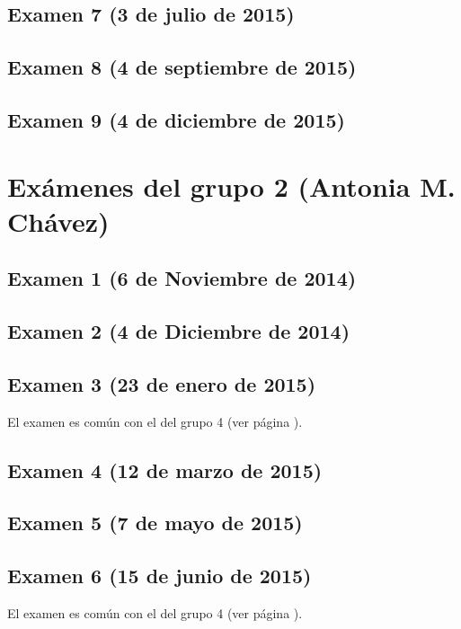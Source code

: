 \documentclass[a4paper,12pt,twoside]{book}
\begin{document}
\subsection{Examen 7 (3 de julio de 2015)}
 \label{examen_14_15_5_7}
\subsection{Examen 8 (4 de septiembre de 2015)}
 \label{examen_14_15_5_8}
\subsection{Examen 9 (4 de diciembre de 2015)}
 \label{examen_14_15_5_9}

\section{Exámenes del grupo 2 (Antonia M. Chávez)}
\subsection{Examen 1 (6 de Noviembre de 2014)}
\subsection{Examen 2 (4 de Diciembre de 2014)}
\subsection{Examen 3 (23 de enero de 2015)}
El examen es común con el del grupo 4 (ver página \pageref{examen_14_15_4_3}).
\subsection{Examen 4 (12 de marzo de 2015)}
\subsection{Examen 5 (7 de mayo de 2015)}
\subsection{Examen 6 (15 de junio de 2015)}
El examen es común con el del grupo 4 (ver página \pageref{examen_14_15_4_6}).
\end{document}
